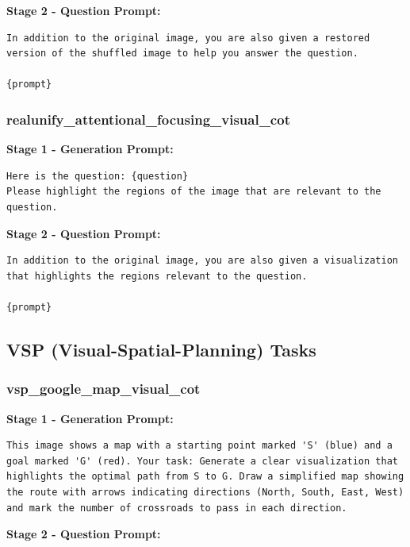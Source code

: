 \documentclass{article}
\theoremstyle{plain}
\theoremstyle{definition}
\theoremstyle{remark}
\begin{document}
\textbf{Stage 2 - Question Prompt:}

\begin{verbatim}
In addition to the original image, you are also given a restored
version of the shuffled image to help you answer the question.

{prompt}
\end{verbatim}

\subsubsection{realunify\_attentional\_focusing\_visual\_cot}

\textbf{Stage 1 - Generation Prompt:}

\begin{verbatim}
Here is the question: {question}
Please highlight the regions of the image that are relevant to the
question.
\end{verbatim}

\textbf{Stage 2 - Question Prompt:}

\begin{verbatim}
In addition to the original image, you are also given a visualization
that highlights the regions relevant to the question.

{prompt}
\end{verbatim}

\subsection{VSP (Visual-Spatial-Planning) Tasks}

\subsubsection{vsp\_google\_map\_visual\_cot}

\textbf{Stage 1 - Generation Prompt:}

\begin{verbatim}
This image shows a map with a starting point marked 'S' (blue) and a
goal marked 'G' (red). Your task: Generate a clear visualization that
highlights the optimal path from S to G. Draw a simplified map showing
the route with arrows indicating directions (North, South, East, West)
and mark the number of crossroads to pass in each direction.
\end{verbatim}

\textbf{Stage 2 - Question Prompt:}
\end{document}
